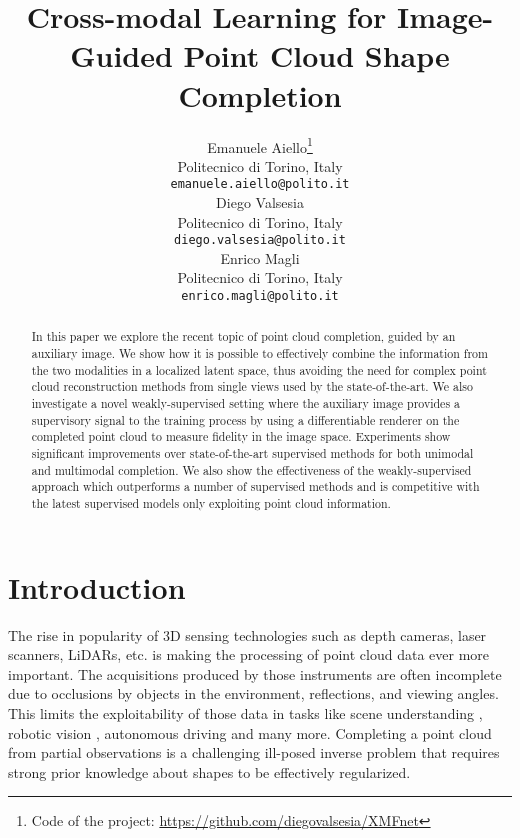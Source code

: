 \documentclass{article}
\title{Cross-modal Learning for Image-Guided Point Cloud Shape Completion}
\author{Emanuele Aiello\thanks{Code of the project: \url{https://github.com/diegovalsesia/XMFnet} } \\
  Politecnico di Torino, Italy\\
  \texttt{emanuele.aiello@polito.it} \\
\And
  Diego Valsesia\\
  Politecnico di Torino, Italy\\
  \texttt{diego.valsesia@polito.it} \\
  \AND
  Enrico Magli\\
  Politecnico di Torino, Italy\\
  \texttt{enrico.magli@polito.it} \\
}
\begin{document}
\maketitle


\begin{abstract}
In this paper we explore the recent topic of point cloud completion, guided by an auxiliary image. We show how it is possible to effectively combine the information from the two modalities in a localized latent space, thus avoiding the need for complex point cloud reconstruction methods from single views used by the state-of-the-art. We also investigate a novel weakly-supervised setting where the auxiliary image provides a supervisory signal to the training process by using a differentiable renderer on the completed point cloud to measure fidelity in the image space. Experiments show significant improvements over state-of-the-art supervised methods for both unimodal and multimodal completion. We also show the effectiveness of the weakly-supervised approach which outperforms a number of supervised methods and is competitive with the latest supervised models only exploiting point cloud information.
\end{abstract}


\section{Introduction}

The rise in popularity of 3D sensing technologies such as depth cameras, laser scanners, LiDARs, etc. is making the processing of point cloud data ever more important. The acquisitions produced by those instruments are often incomplete due to occlusions by objects in the environment, reflections, and viewing angles. This limits the exploitability of those data in tasks like scene understanding \cite{hou20193d}, robotic vision \cite{varley2017shape}, autonomous driving \cite{li2020deep} and many more. Completing a point cloud from partial observations is a challenging ill-posed inverse problem that requires strong prior knowledge about shapes to be effectively regularized. 
\end{document}
